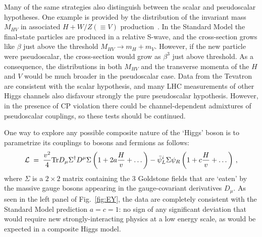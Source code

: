 \documentclass[12pt]{article}
\numberwithin{equation}{section}
\begin{document}
Many of the same strategies also distinguish between the scalar and pseudoscalar
hypotheses. One example is provided by the distribution of the invariant mass $M_{HV}$ in associated $H + W/Z (\equiv V)$ production~\cite{H+V}.
In the Standard Model the final-state particles are produced in a relative S-wave, and the cross-section
grows like $\beta$ just above the threshold $M_{HV} \to m_H + m_V$. However, if the new particle were pseudoscalar,
the cross-section would grow as $\beta^3$ just above threshold. As a consequence,  the distributions in both $M_{HV}$
and the transverse momenta of the $H$ and $V$ would be much broader in the pseudoscalar case.
Data from the Tevatron are consistent with the scalar hypothesis, and many LHC measurements of other Higgs channels
also disfavour strongly the pure pseudoscalar hypothesis.
However, in the presence of CP violation there could be channel-dependent admixtures of pseudoscalar
couplings, so these tests should be continued.

One way to explore any possible composite nature of the `Higgs' boson is to parametrize its couplings to bosons and fermions as follows:
\begin{equation}
{\cal L} \; = \; \frac{v^2}{4} {\rm Tr} D_\mu \Sigma^\dagger D^\mu \Sigma \left( 1 + 2 a \frac{H}{v} + \dots \right) 
- {\bar \psi}^i_L \Sigma \psi_R \left(1 + c \frac{H}{v} + \dots \right) \, ,
\label{calL}
\end{equation}
where $\Sigma$ is a $2 \times 2$ matrix containing the 3 Goldstone fields that are `eaten' by the massive
gauge bosons appearing in the gauge-covariant derivatives $D_\mu$.
As seen in the left panel of Fig.~\ref{fig:EY}, the data are completely consistent with the Standard Model prediction $a = c = 1$:
no sign of any significant deviation that would require new strongly-interacting physics at a low energy scale,
as would be expected in a composite Higgs model.
\end{document}
